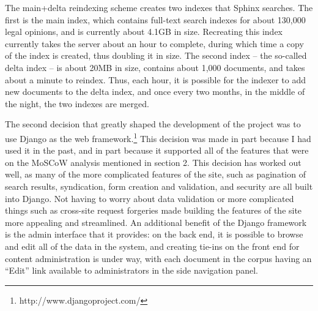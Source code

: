 The main+delta reindexing scheme creates two indexes that Sphinx searches. The first is the main index, which contains full-text search indexes for about 130,000 legal opinions, and is currently about 4.1GB in size. Recreating this index currently takes the server about an hour to complete, during which time a copy of the index is created, thus doubling it in size. The second index -- the so-called delta index -- is about 20MB in size, contains about 1,000 documents, and takes about a minute to reindex. Thus, each hour, it is possible for the indexer to add new documents to the delta index, and once every two months, in the middle of the night, the two indexes are merged.


The second decision that greatly shaped the development of the project was to use Django as the web framework.\footnote{http://www.djangoproject.com/} This decision was made in part because I had used it in the past, and in part because it supported all of the features that were on the MoSCoW analysis mentioned in section 2. This decision has worked out well, as many of the more complicated features of the site, such as pagination of search results, syndication, form creation and validation, and security are all built into Django. Not having to worry about data validation or more complicated things such as cross-site request forgeries made building the features of the site more appealing and streamlined. An additional benefit of the Django framework is the admin interface that it provides: on the back end, it is possible to browse and edit all of the data in the system, and creating tie-ins on the front end for content administration is under way, with each document in the corpus having an ``Edit'' link available to administrators in the side navigation panel.


